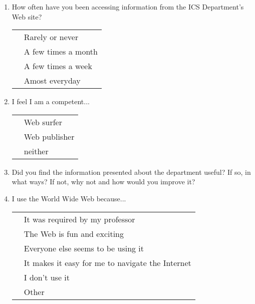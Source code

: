 \begin{enumerate}
\item{How often have you been accessing information from the ICS
  Department's Web site?}\\
  \begin{tabular}{ll}
  \underline{  }\underline{  }\underline{  }  & Rarely or never\\
  \underline{  }\underline{  }\underline{  }  & A few times a month\\
  \underline{  }\underline{  }\underline{  }  & A few times a week\\
  \underline{  }\underline{  }\underline{  }  & Amost everyday\\
  \end{tabular}

\item{I feel I am a competent...}\\
  \begin{tabular}{ll}
  \underline{  }\underline{  }\underline{  }  & Web surfer\\
  \underline{  }\underline{  }\underline{  }  & Web publisher\\
  \underline{  }\underline{  }\underline{  }  & neither\\
  \end{tabular}

\item{Did you find the information presented about the department useful?
  If so, in what ways?  If not, why not and how would you improve it?}
\\ 

\item{I use the World Wide Web because...}\\
  \begin{tabular}{ll}
  \underline{  }\underline{  }\underline{  }  & It was required by my professor\\
  \underline{  }\underline{  }\underline{  }  & The Web is fun and exciting\\
  \underline{  }\underline{  }\underline{  }  & Everyone else seems to be using it\\
  \underline{  }\underline{  }\underline{  }  & It makes it easy for me to
  navigate the Internet\\
  \underline{  }\underline{  }\underline{  }  & I don't use it\\
  \underline{  }\underline{  }\underline{  }  & Other\\
  \end{tabular}


\end{enumerate}
